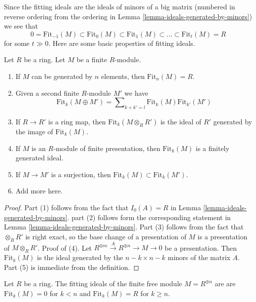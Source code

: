 \noindent
Since the fitting ideals are the ideals of minors of a big matrix
(numbered in reverse ordering from the ordering in
Lemma \ref{lemma-ideals-generated-by-minors})
we see that
$$
0 = \text{Fit}_{-1}(M) \subset \text{Fit}_0(M) \subset \text{Fit}_1(M)
\subset \ldots \subset \text{Fit}_t(M) = R
$$
for some $t \gg 0$. Here are some basic properties of fitting ideals.

\begin{lemma}
\label{lemma-fitting-ideal-basics}
Let $R$ be a ring. Let $M$ be a finite $R$-module.
\begin{enumerate}
\item If $M$ can be generated by $n$ elements, then
$\text{Fit}_n(M) = R$.
\item Given a second finite $R$-module $M'$ we have
$$
\text{Fit}_k(M \oplus M') =
\sum\nolimits_{k + k' = l} \text{Fit}_k(M)\text{Fit}_{k'}(M')
$$
\item If $R \to R'$ is a ring map, then $\text{Fit}_k(M \otimes_R R')$
is the ideal of $R'$ generated by the image of $\text{Fit}_k(M)$.
\item If $M$ is an $R$-module of finite presentation, then $\text{Fit}_k(M)$
is a finitely generated ideal.
\item If $M \to M'$ is a surjection, then
$\text{Fit}_k(M) \subset \text{Fit}_k(M')$.
\item Add more here.
\end{enumerate}
\end{lemma}

\begin{proof}
Part (1) follows from the fact that $I_0(A) = R$ in
Lemma \ref{lemma-ideals-generated-by-minors}.
part (2) follows form the corresponding statement in
Lemma \ref{lemma-ideals-generated-by-minors}.
Part (3) follows from the fact that $\otimes_R R'$ is right exact,
so the base change of a presentation of $M$ is a presentation of
$M \otimes_R R'$.
Proof of (4). Let $R^{\oplus m} \xrightarrow{A} R^{\oplus n} \to M \to 0$
be a presentation. Then $\text{Fit}_k(M)$ is the ideal generated by the
$n - k \times n - k$ minors of the matrix $A$.
Part (5) is immediate from the definition.
\end{proof}

\begin{example}
\label{example-fitting-free}
Let $R$ be a ring.
The fitting ideals of the finite free module $M = R^{\oplus n}$ are
are $\text{Fit}_k(M) = 0$ for $k < n$ and $\text{Fit}_k(M) = R$
for $k \geq n$.
\end{example}

